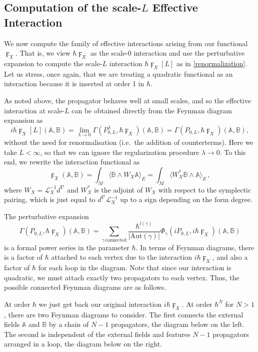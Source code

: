 \documentclass[reqno]{amsart}
\theoremstyle{definition}
\theoremstyle{remark}
\newcommand{\A}{\mathbb{A}}
\newcommand{\B}{\mathbb{B}}
\renewcommand{\d}{d^\nabla}
\newcommand{\h}{\hbar}
\renewcommand{\L}{\mathcal{L}}
\begin{document}
\subsection{Computation of the scale-$L$ Effective Interaction}
\label{section_comp_diagrams}

We now compute the family of effective interactions arising from our functional $\digamma_X$. That is, we view $\h \digamma_X$ as the scale-$0$ interaction and use the perturbative expansion to compute the scale-$L$ interaction $\h \digamma_X[L]$ as in \eqref{renormalization}. Let us stress, once again, that we are treating a quadratic functional as an interaction because it is inserted at order 1 in $\hbar$.


As noted above, the propagator behaves well at small scales, and so the effective interaction at scale-$L$ can be obtained directly from the Feynman diagram expansion as
$$i\h \digamma_X[L](\A,\B) =\lim_{\lambda\to 0} \Gamma(P^\lambda_{0,L},\h \digamma_X)(\A,\B) = \Gamma(P_{0,L},\h \digamma_X)(\A,\B),$$
without the need for renormalisation (i.e.\ the addition of counterterms). Here we take $L<\infty$, so that we can ignore the regularization procedure $\lambda\to 0$.
To this end, we rewrite the interaction functional as
$$\digamma_X(\A,\B) = \int_M \langle\B\wedge W_X\A\rangle_E = \int_M \langle W_X^*\B\wedge\A\rangle_E \,,$$
where $W_X=\L_X^{-1}\d$ and $W_X^*$ is the adjoint of $W_X$ with respect to the symplectic pairing, which is just equal to $\d\L_X^{-1}$ up to a sign depending on the form degree.

The perturbative expansion 
$$\Gamma(P_{0,L},\hbar \digamma_X)(\A,\B) = \sum_{\gamma\, \mathrm{connected}} \frac{\h^{l(\gamma)}}{|\mathrm{Aut}(\gamma)|}\Phi_\gamma(iP_{0,L},i\h \digamma_X)(\A,\B)$$ is a formal power series in the parameter $\h$. In terms of Feynman diagrams, there is a factor of $\h$ attached to each vertex due to the interaction $i\h \digamma_X$, and also a factor of $\h$ for each loop in the diagram. Note that since our interaction is quadratic, we must attach exactly two propagators to each vertex. Thus, the possible connected Feynman diagrams are as follows. 

At order $\hbar$ we just get back our original interaction $i\h \digamma_X$. At order $\hbar^{N}$ for $N > 1$, there are two Feynman diagrams to consider. The first connects the external fields $\A$ and $\B$ by a chain of $N-1$ propagators, the diagram below on the left. The second is independent of the external fields and features $N-1$ propagators arranged in a loop, the diagram below on the right.
\end{document}
